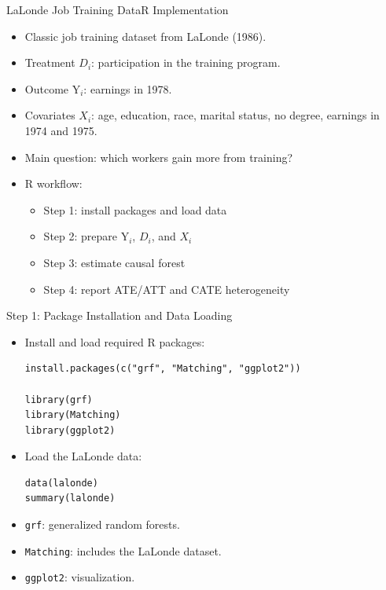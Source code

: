 \documentclass[hyperref={pdfpagelabels=false}]{beamer}
\begin{document}
\begin{frame}{LaLonde Job Training Data}{R Implementation}
\begin{itemize}
  \item Classic job training dataset from LaLonde (1986).
  \vspace{0.2cm}
  \item Treatment $D_i$: participation in the training program.
  \vspace{0.2cm}
  \item Outcome $\mathrm{Y}_i$: earnings in 1978.
  \vspace{0.2cm}
  \item Covariates $X_i$: age, education, race, marital status, no degree, earnings in 1974 and 1975.
  \vspace{0.2cm}
  \item Main question: which workers gain more from training?
  \vspace{0.2cm}
  \item R workflow:
  \begin{itemize}
    \item Step 1: install packages and load data
    \item Step 2: prepare $\mathrm{Y}_i$, $D_i$, and $X_i$
    \item Step 3: estimate causal forest
    \item Step 4: report ATE/ATT and CATE heterogeneity
  \end{itemize}
\end{itemize}
\end{frame}

\begin{frame}[fragile]{Step 1: Package Installation and Data Loading}
\begin{itemize}
  \item Install and load required R packages:
\begin{lstlisting}[style=r-style]
install.packages(c("grf", "Matching", "ggplot2"))

library(grf)
library(Matching)
library(ggplot2)
\end{lstlisting}
  \vspace{0.1cm}
  \item Load the LaLonde data:
\begin{lstlisting}[style=r-style]
data(lalonde)
summary(lalonde)
\end{lstlisting}
  \vspace{0.1cm}
  \item \texttt{grf}: generalized random forests.
  \item \texttt{Matching}: includes the LaLonde dataset.
  \item \texttt{ggplot2}: visualization.
\end{itemize}
\end{frame}
\end{document}
